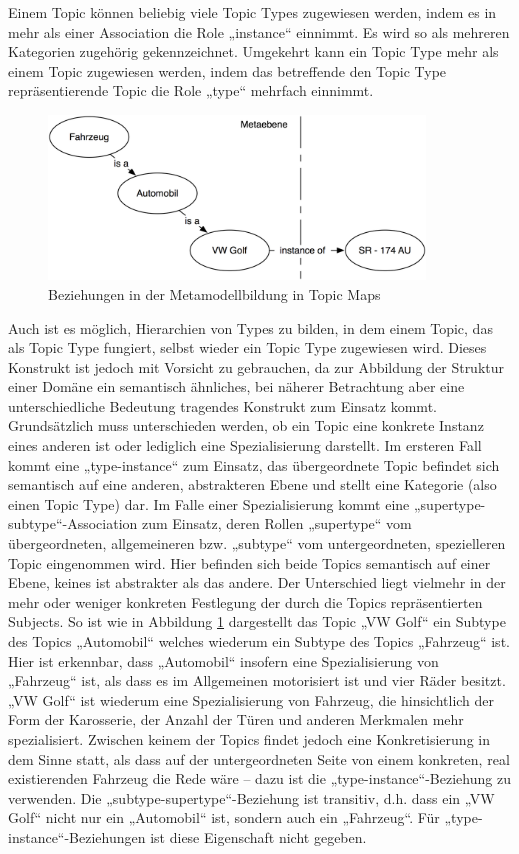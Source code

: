 Einem Topic können beliebig viele Topic Types zugewiesen werden, indem es in mehr als einer Association die Role „instance“ einnimmt. Es wird so als mehreren Kategorien zugehörig gekennzeichnet. Umgekehrt kann ein Topic Type mehr als einem Topic zugewiesen werden, indem das betreffende den Topic Type repräsentierende Topic die Role „type“ mehrfach einnimmt.

\begin{figure}[htbp]
	\centering
		\includegraphics[width=10cm]{img/Persistenz/MetaModelExample.png}
	\caption{Beziehungen in der Metamodellbildung in Topic Maps}
	\label{fig:img_Persistenz_MetaModelExample}
\end{figure}

Auch ist es möglich, Hierarchien von Types zu bilden, in dem einem Topic, das als Topic Type fungiert, selbst wieder ein Topic Type zugewiesen wird. Dieses Konstrukt ist jedoch mit Vorsicht zu gebrauchen, da zur Abbildung der Struktur einer Domäne ein semantisch ähnliches, bei näherer Betrachtung aber eine unterschiedliche Bedeutung tragendes Konstrukt zum Einsatz kommt. Grundsätzlich muss unterschieden werden, ob ein Topic eine konkrete Instanz eines anderen ist oder lediglich eine Spezialisierung darstellt. Im ersteren Fall kommt eine „type-instance“ zum Einsatz, das übergeordnete Topic befindet sich semantisch auf eine anderen, abstrakteren Ebene und stellt eine Kategorie (also einen Topic Type) dar. Im Falle einer Spezialisierung kommt eine „supertype-subtype“-Association zum Einsatz, deren Rollen „supertype“ vom übergeordneten, allgemeineren bzw. „subtype“ vom untergeordneten, spezielleren Topic eingenommen wird. Hier befinden sich beide Topics semantisch auf einer Ebene, keines ist abstrakter als das andere. Der Unterschied liegt vielmehr in der mehr oder weniger konkreten Festlegung der durch die Topics repräsentierten Subjects. So ist wie in Abbildung \ref{fig:img_Persistenz_MetaModelExample} dargestellt das Topic „VW Golf“ ein Subtype des Topics „Automobil“ welches wiederum ein Subtype des Topics „Fahrzeug“ ist. Hier ist erkennbar, dass „Automobil“ insofern eine Spezialisierung von „Fahrzeug“ ist, als dass es im Allgemeinen motorisiert ist und vier Räder besitzt. „VW Golf“ ist wiederum eine Spezialisierung von Fahrzeug, die hinsichtlich der Form der Karosserie, der Anzahl der Türen und anderen Merkmalen mehr spezialisiert. Zwischen keinem der Topics findet jedoch eine Konkretisierung in dem Sinne statt, als dass auf der untergeordneten Seite von einem konkreten, real existierenden Fahrzeug die Rede wäre -- dazu ist die „type-instance“-Beziehung zu verwenden. Die „subtype-supertype“-Beziehung ist transitiv, d.h. dass ein „VW Golf“ nicht nur ein „Automobil“ ist, sondern auch ein „Fahrzeug“. Für „type-instance“-Beziehungen ist diese Eigenschaft nicht gegeben. 

